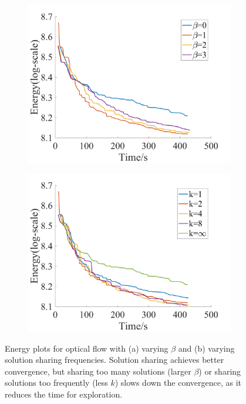 \begin{figure}[!h]
  \centering
  \begin{subfigure}[b]{0.49\columnwidth}
    \centering
    \includegraphics[width=\columnwidth]{figure/optical_flow_by_beta.png}
    \caption{}
    \label{fig:optical_flow_by_beta}
  \end{subfigure}  
  \begin{subfigure}[b]{0.49\columnwidth}
    \centering
    \includegraphics[width=\columnwidth]{figure/optical_flow_by_interval.png}
    \caption{}
    \label{fig:optical_flow_by_interval}
  \end{subfigure}
  \caption{Energy plots for optical flow with (a) varying
    $\beta$ and (b) varying solution sharing
    frequencies. Solution sharing achieves better convergence, but sharing too many solutions (larger $\beta$) or sharing solutions too frequently (less $k$) slows down the convergence, as it reduces the time for exploration.}
\end{figure}
